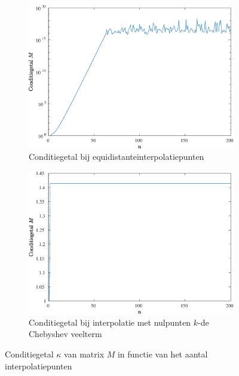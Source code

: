 \documentclass[a4paper, 12pt, titlepage, fleqn]{article}
\begin{document}
\begin{figure}
\begin{subfigure}[b]{0.45\textwidth}
\includegraphics[width=\linewidth]{../Afbeeldingen/runge_equi_kappa.eps}
\caption{Conditiegetal bij equidistanteinterpolatiepunten}
\end{subfigure}
\hfill
\begin{subfigure}[b]{0.45\textwidth}
\includegraphics[width=\linewidth]{../Afbeeldingen/runge_nul_kappa.eps}
\caption{Conditiegetal bij interpolatie met nulpunten $k$-de Chebyshev veelterm}
\end{subfigure}
\caption{Conditiegetal $\kappa$ van matrix $M$ in functie van het aantal interpolatiepunten}
\label{fig:kappa}
\end{figure}
\end{document}
